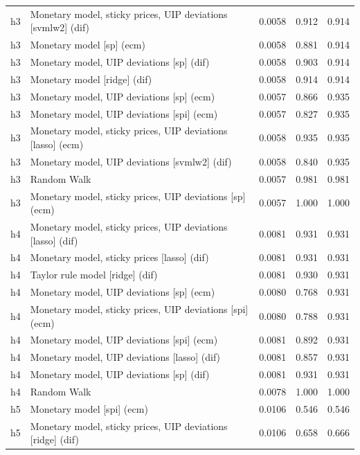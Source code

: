 \begin{ThreePartTable}
\begin{longtable}[t]{cp{5.5cm}ccc}
h3 & \raggedright Monetary model, sticky prices, UIP deviations [svmlw2] (dif) & 0.0058 & 0.912 & 0.914\\
h3 & \raggedright Monetary model [sp] (ecm) & 0.0058 & 0.881 & 0.914\\
h3 & \raggedright Monetary model, UIP deviations [sp] (dif) & 0.0058 & 0.903 & 0.914\\
h3 & \raggedright Monetary model [ridge] (dif) & 0.0058 & 0.914 & 0.914\\
h3 & \raggedright Monetary model, UIP deviations [sp] (ecm) & 0.0057 & 0.866 & 0.935\\
h3 & \raggedright Monetary model, UIP deviations [spi] (ecm) & 0.0057 & 0.827 & 0.935\\
h3 & \raggedright Monetary model, sticky prices, UIP deviations [lasso] (ecm) & 0.0058 & 0.935 & 0.935\\
h3 & \raggedright Monetary model, UIP deviations [svmlw2] (dif) & 0.0058 & 0.840 & 0.935\\
h3 & \raggedright Random Walk & 0.0057 & 0.981 & 0.981\\
h3 & \raggedright Monetary model, sticky prices, UIP deviations [sp] (ecm) & 0.0057 & 1.000 & 1.000\\
\addlinespace
h4 & \raggedright Monetary model, sticky prices, UIP deviations [lasso] (dif) & 0.0081 & 0.931 & 0.931\\
h4 & \raggedright Monetary model, sticky prices [lasso] (dif) & 0.0081 & 0.931 & 0.931\\
h4 & \raggedright Taylor rule model [ridge] (dif) & 0.0081 & 0.930 & 0.931\\
h4 & \raggedright Monetary model, UIP deviations [sp] (ecm) & 0.0080 & 0.768 & 0.931\\
h4 & \raggedright Monetary model, sticky prices, UIP deviations [spi] (ecm) & 0.0080 & 0.788 & 0.931\\
h4 & \raggedright Monetary model, UIP deviations [spi] (ecm) & 0.0081 & 0.892 & 0.931\\
h4 & \raggedright Monetary model, UIP deviations [lasso] (dif) & 0.0081 & 0.857 & 0.931\\
h4 & \raggedright Monetary model, UIP deviations [sp] (dif) & 0.0081 & 0.931 & 0.931\\
h4 & \raggedright Random Walk & 0.0078 & 1.000 & 1.000\\
\addlinespace
h5 & \raggedright Monetary model [spi] (ecm) & 0.0106 & 0.546 & 0.546\\
h5 & \raggedright Monetary model, sticky prices, UIP deviations [ridge] (dif) & 0.0106 & 0.658 & 0.666\\

\end{longtable}
\end{ThreePartTable}
